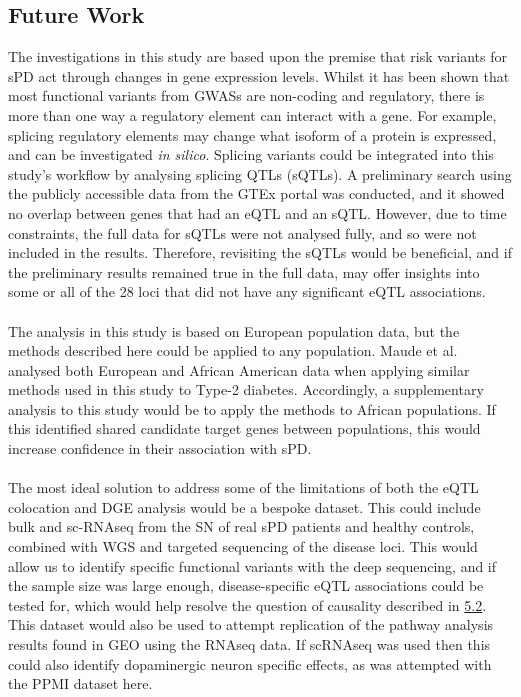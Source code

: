 \documentclass{article}
\begin{document}
\subsection{Future Work}
The investigations in this study are based upon the premise that risk variants for sPD act through changes in gene expression levels. Whilst it has been shown that most functional variants from GWASs are non-coding and regulatory\cite{Maurano2012SystematicDNA}, there is more than one way a regulatory element can interact with a gene. For example, splicing regulatory elements may change what isoform of a protein is expressed, and can be investigated \textit{in silico}\cite{Tubeuf2020LargescaleElements}. Splicing variants could be integrated into this study's workflow by analysing splicing QTLs (sQTLs). A preliminary search using the publicly accessible data from the GTEx portal\cite{Aguet2020TheTissues} was conducted, and it showed no overlap between genes that had an eQTL and an sQTL. However, due to time constraints, the full data for sQTLs were not analysed fully, and so were not included in the results. Therefore, revisiting the sQTLs would be beneficial, and if the preliminary results remained true in the full data, may offer insights into some or all of the 28 loci that did not have any significant eQTL associations.
\\
\\The analysis in this study is based on European population data, but the methods described here could be applied to any population. Maude et al.\cite{Maude2021NewDiabetes.} analysed both European and African American data when applying similar methods used in this study to Type-2 diabetes. Accordingly, a supplementary analysis to this study would be to apply the methods to African populations. If this identified shared candidate target genes between populations, this would increase confidence in their association with sPD. 
\\
\\The most ideal solution to address some of the limitations of both the eQTL colocation and DGE analysis would be a bespoke dataset. This could include bulk and sc-RNAseq from the SN of real sPD patients and healthy controls, combined with WGS and targeted sequencing of the disease loci. This would allow us to identify specific functional variants with the deep sequencing, and if the sample size was large enough, disease-specific eQTL associations could be tested for, which would help resolve the question of causality described in \hyperref[subsubsec:causality]{5.2}. This dataset would also be used to attempt replication of the pathway analysis results found in GEO using the RNAseq data. If scRNAseq was used then this could also identify dopaminergic neuron specific effects, as was attempted with the PPMI dataset here. 
\newpage
\end{document}
